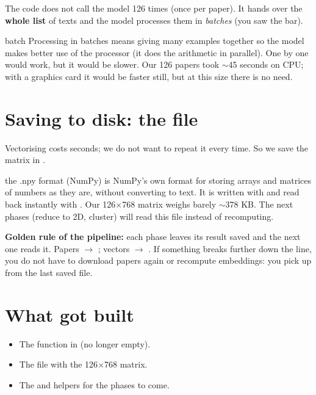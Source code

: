 \documentclass[11pt,a4paper]{article}
\begin{document}
The code does not call the model 126 times (once per paper). It hands over the \textbf{whole
list} of texts and the model processes them in \emph{batches} (you saw the
 bar).

\begin{concepto}{batch}
Processing in batches means giving many examples together so the model makes better use of
the processor (it does the arithmetic in parallel). One by one would work, but it would be
slower. Our 126 papers took $\sim$45 seconds on CPU; with a graphics card it would be faster
still, but at this size there is no need.
\end{concepto}

\section{Saving to disk: the  file}

Vectorising costs seconds; we do not want to repeat it every time. So we save the matrix in
.

\begin{concepto}{the .npy format (NumPy)}
 is NumPy's own format for storing arrays and matrices of numbers as they are,
without converting to text. It is written with  and read back instantly
with . Our 126$\times$768 matrix weighs barely $\sim$378 KB. The next
phases (reduce to 2D, cluster) will read this file instead of recomputing.
\end{concepto}

\begin{ojo}
\textbf{Golden rule of the pipeline:} each phase leaves its result saved and the next one
reads it. Papers $\rightarrow$ ; vectors $\rightarrow$
. If something breaks further down the line, you do not have to download
papers again or recompute embeddings: you pick up from the last saved file.
\end{ojo}

\section{What got built}

\begin{itemize}
  \item The  function in  (no longer empty).
  \item The file  with the 126$\times$768 matrix.
  \item The  and  helpers for the
        phases to come.
\end{itemize}
\end{document}
